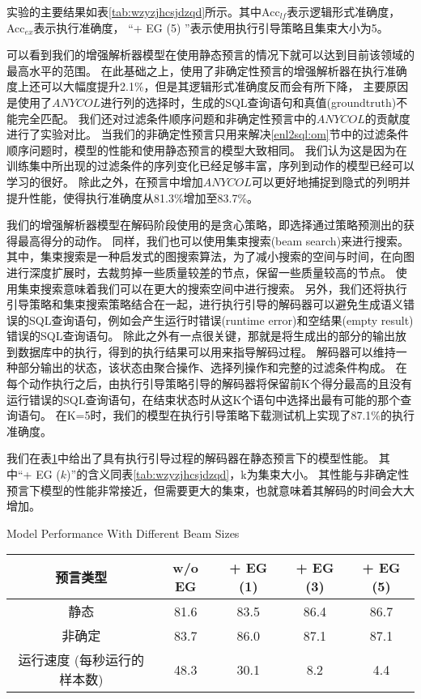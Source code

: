 实验的主要结果如表\ref{tab:wzyzjhcsjdzqd}所示。其中Acc$_{lf}$表示逻辑形式准确度，Acc$_{ex}$表示执行准确度，
“+ EG (5) ”表示使用执行引导策略且集束大小为5。

可以看到我们的增强解析器模型在使用静态预言的情况下就可以达到目前该领域的最高水平\cite{dong2018coarse}的范围。
在此基础之上，使用了非确定性预言的增强解析器在执行准确度上还可以大幅度提升2.1\%，但是其逻辑形式准确度反而会有所下降，
主要原因是使用了$ANYCOL$进行列的选择时，生成的SQL查询语句和真值(groundtruth)不能完全匹配。
我们还对过滤条件顺序问题和非确定性预言中的$ANYCOL$的贡献度进行了实验对比。
当我们的非确定性预言只用来解决\ref{enl2sql:om}节中的过滤条件顺序问题时，模型的性能和使用静态预言的模型大致相同。
我们认为这是因为在训练集中所出现的过滤条件的序列变化已经足够丰富，序列到动作的模型已经可以学习的很好。
除此之外，在预言中增加$ANYCOL$可以更好地捕捉到隐式的列明并提升性能，使得执行准确度从81.3\%增加至83.7\%。

我们的增强解析器模型在解码阶段使用的是贪心策略，即选择通过策略预测出的获得最高得分的动作。
同样，我们也可以使用集束搜索(beam search)来进行搜索。
其中，集束搜索是一种启发式的图搜索算法，为了减小搜索的空间与时间，在向图进行深度扩展时，去裁剪掉一些质量较差的节点，保留一些质量较高的节点。
使用集束搜索意味着我们可以在更大的搜索空间中进行搜索。
另外，我们还将执行引导策略和集束搜索策略结合在一起，进行执行引导的解码器可以避免生成语义错误的SQL查询语句，例如会产生运行时错误(runtime error)和空结果(empty result)错误的SQL查询语句。
除此之外有一点很关键，那就是将生成出的部分的输出放到数据库中的执行，得到的执行结果可以用来指导解码过程。
解码器可以维持一种部分输出的状态，该状态由聚合操作、选择列操作和完整的过滤条件构成。
在每个动作执行之后，由执行引导策略引导的解码器将保留前K个得分最高的且没有运行错误的SQL查询语句，在结束状态时从这K个语句中选择出最有可能的那个查询语句。
在K=5时，我们的模型在执行引导策略下载测试机上实现了87.1\%的执行准确度。

我们在表\ref{enl2sql:sybtjsdxdmxxn}中给出了具有执行引导过程的解码器在静态预言下的模型性能。
其中“+ EG ($k$)”的含义同表\ref{tab:wzyzjhcsjdzqd}，k为集束大小。
其性能与非确定性预言下模型的性能非常接近，但需要更大的集束，也就意味着其解码的时间会大大增加。

\begin{table}[!hpb]
  \centering
    {Model Performance With Different Beam Sizes}
  \label{enl2sql:sybtjsdxdmxxn}
  \begin{tabular}{ccccc} \toprule
    \textbf{预言类型} & \textbf{w/o EG} & \textbf{+ EG (1)} & \textbf{+ EG (3)} & \textbf{+ EG (5)}\\\midrule
    静态 & 81.6 & 83.5 & 86.4 & 86.7\\
    非确定 & 83.7 & 86.0 & 87.1 & 87.1\\\midrule
    运行速度 (每秒运行的样本数) & 48.3 & 30.1 & 8.2 & 4.4\\
    \bottomrule
  \end{tabular}
\end{table}

